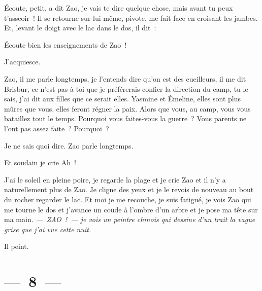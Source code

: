 \documentclass[french,twoside]{book} %
\begin{document}
\par
\bigbreak
\noindent Écoute, petit, a dit Zao, je vais te dire quelque chose, mais avant tu peux t’asseoir ! Il se retourne sur lui-même, pivote, me fait face en croisant les jambes. Et, levant le doigt avec le lac dans le dos, il dit :\par
Écoute bien les enseignements de Zao !\par
J’acquiesce.\par
Zao, il me parle longtemps, je l’entends dire qu’on est des cueilleurs, il me dit Brisbur, ce n’est pas à toi que je préférerais confier la direction du camp, tu le sais, j’ai dit aux filles que ce serait elles. Yasmine et Émeline, elles sont plus mûres que vous, elles feront régner la paix. Alors que vous, au camp, vous vous bataillez tout le temps. Pourquoi vous faites-vous la guerre ? Vous parents ne l’ont pas assez faite ? Pourquoi ?\par
Je ne sais quoi dire. Zao parle longtemps.\par
Et soudain je crie Ah !\par
J’ai le soleil en pleine poire, je regarde la plage et je crie Zao et il n’y a naturellement plus de Zao. Je cligne des yeux et je le revois de nouveau au bout du rocher regarder le lac. Et moi je me recouche, je suis fatigué, je vois Zao qui me tourne le dos et j’avance un coude à l’ombre d’un arbre et je pose ma tête sur ma main. \emph{— ZAO ! — je vois un peintre chinois qui dessine d’un trait la vague grise que j’ai vue cette nuit.}\par
Il peint.

\section[{— 8 —}]{— 8 —}
\renewcommand{\leftmark}{— 8 —}
\end{document}
